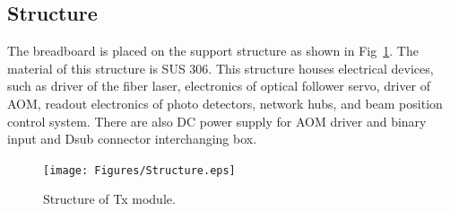 \subsection{Structure}
The breadboard is placed on the support structure as shown in Fig~\ref{fig:Tx_structure}. The material of this structure is SUS 306. This structure houses electrical devices, such as driver of the fiber laser, electronics of optical follower servo, driver of AOM, readout electronics of photo detectors, network hubs, and beam position control system. There are also DC power supply for AOM driver and binary input and Dsub connector interchanging box.
\begin{figure}
\begin{center}
\texttt{[image: Figures/Structure.eps]}
\caption{Structure of Tx module.} 
\label{fig:Tx_structure} 
\end{center}
\end{figure}

